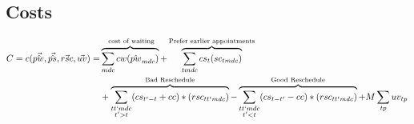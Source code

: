 \subsection{Costs}
\begin{equation}\begin{alignedat}{10}
		& C = c(\vec{\hat{pw}}, \vec{\hat{ps}}, \vec{rsc}, \vec{uv}) = 
		&& 
		\overbrace{ \sum_{mdc} cw (\hat{pw}_{mdc}) }^\text{
			cost of waiting}  + 
		\overbrace{
			\sum_{tmdc} cs_{t} (sc_{tmdc})
		}^\text{Prefer earlier appointments} \\ 
		&	&&  +
		\overbrace{
			\sum_{
				\substack{tt`mdc \\ t' > t}} 
			(cs_{t'-t} + cc) * (rsc_{tt'mdc})}^\text{Bad Reschedule} - 
		\overbrace{ 
			\sum_{
				\substack{tt`mdc \\ t' < t}}
			(cs_{t-t'} - cc) * (rsc_{tt'mdc})}^\text{Good Reschedule} + 
		M \sum_{tp} uv_{tp}
\end{alignedat}\end{equation}